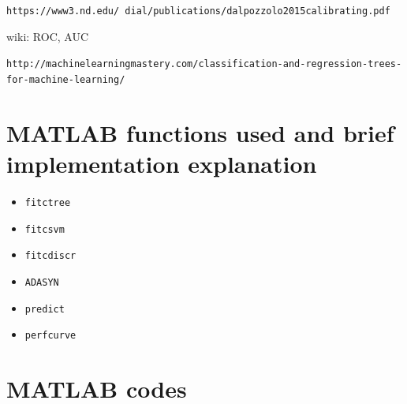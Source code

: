\documentclass{article}
\begin{document}
\clearpage
\begin{thebibliography}{9}

\texttt{https://www3.nd.edu/~dial/publications/dalpozzolo2015calibrating.pdf}

wiki: ROC, AUC

\texttt{http://machinelearningmastery.com/classification-and-regression-trees-for-machine-learning/}

\end{thebibliography}

\begin{appendices}
\section{MATLAB functions used and brief implementation explanation}
\begin{itemize}
	\item \texttt{fitctree}
	\item \texttt{fitcsvm}
	\item \texttt{fitcdiscr}
	\item \texttt{ADASYN}
	\item \texttt{predict}
	\item \texttt{perfcurve}
\end{itemize}

\section{MATLAB codes}




\end{appendices}
\end{document}
